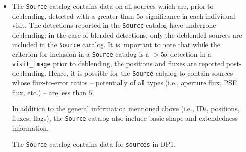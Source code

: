 \begin{itemize}
\item The \texttt{Source} catalog contains data on all sources which are, prior to deblending, detected with a greater than 5$\sigma$ significance in each individual visit.
The detections reported in the \texttt{Source} catalog have undergone deblending; in the case of blended detections, only the deblended sources are included in the \texttt{Source} catalog.
It is important to note that while the criterion for inclusion in a \texttt{Source} catalog is a $>5\sigma$ detection in a \texttt{visit\_image} prior to deblending, the positions and fluxes are reported post-deblending. Hence, it is possible for the \texttt{Source} catalog to contain sources whose \gls{flux}-to-error ratios -- potentially of all types (i.e., aperture \gls{flux}, \gls{PSF} \gls{flux}, etc.) -- are less than $5$.

In addition to the general information mentioned above (i.e., IDs, positions, fluxes, flags), the \texttt{Source} catalog also include basic \gls{shape} and extendedness information.

The \texttt{Source} catalog contains data for \nsources \texttt{sources} in \gls{DP1}.



\end{itemize}
